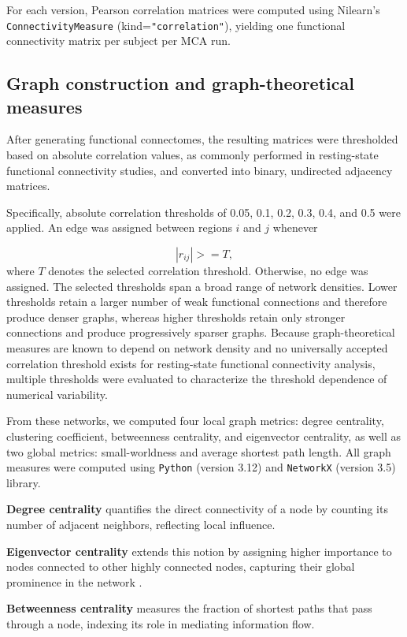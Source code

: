 For each version, Pearson correlation matrices were computed using Nilearn’s \texttt{ConnectivityMeasure} (kind=\texttt{"correlation"}), yielding one functional connectivity matrix per subject per MCA run.

\subsection{Graph construction and graph-theoretical measures}
After generating functional connectomes, the resulting matrices were thresholded based on absolute correlation values, as commonly performed in resting-state functional connectivity studies, and converted into binary, undirected adjacency matrices.

Specifically, absolute correlation thresholds of 0.05, 0.1, 0.2, 0.3, 0.4, and 0.5 were applied. An edge was assigned between regions \(i\) and \(j\) whenever

\[
\left| r_{ij} \right| >= T,
\]
where \(T\) denotes the selected correlation threshold. Otherwise, no edge was assigned.
The selected thresholds span a broad range of network densities. Lower thresholds retain a larger number of weak functional connections and therefore produce denser graphs, whereas higher thresholds retain only stronger connections and produce progressively sparser graphs. Because graph-theoretical measures are known to depend on network density and no universally accepted correlation threshold exists for resting-state functional connectivity analysis, multiple thresholds were evaluated to characterize the threshold dependence of numerical variability.

From these networks, we computed four local graph metrics: degree centrality, clustering coefficient, betweenness centrality, and eigenvector centrality, as well as two global metrics: small-worldness and average shortest path length. All graph measures were computed using \texttt{Python} (version 3.12) and \texttt{NetworkX} (version 3.5) library.

\textbf{Degree centrality} quantifies the direct connectivity of a node by counting its number of adjacent neighbors, reflecting local influence. 

\textbf{Eigenvector centrality} extends this notion by assigning higher importance to nodes connected to other highly connected nodes, capturing their global prominence in the network \cite{Akbari2023Graphtheory}. 

\textbf{Betweenness centrality} measures the fraction of shortest paths that pass through a node, indexing its role in mediating information flow. 


